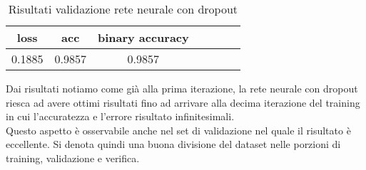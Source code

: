 \renewcommand{\arraystretch}{1.4}
\begin{table}[H]
	\begin{center}
		\begin{tabular}{|c|c|c|c|c|c|c|}
			\hline
			 \textbf{loss} & \textbf{acc} & \textbf{binary accuracy} \\ \hline
			0.1885  & 0.9857 & 0.9857 \\ \hline
		\end{tabular}
		\caption{Risultati validazione rete neurale con dropout\label{}}
	\end{center}
\end{table}
\renewcommand{\arraystretch}{1}
Dai risultati notiamo come già alla prima iterazione, la rete neurale con dropout riesca ad avere ottimi risultati fino ad arrivare alla decima iterazione del training in cui l'accuratezza e l'errore risultato infinitesimali.\\
Questo aspetto è osservabile anche nel set di validazione nel quale il risultato è eccellente. Si denota quindi una buona divisione del dataset nelle porzioni di training, validazione e verifica.
